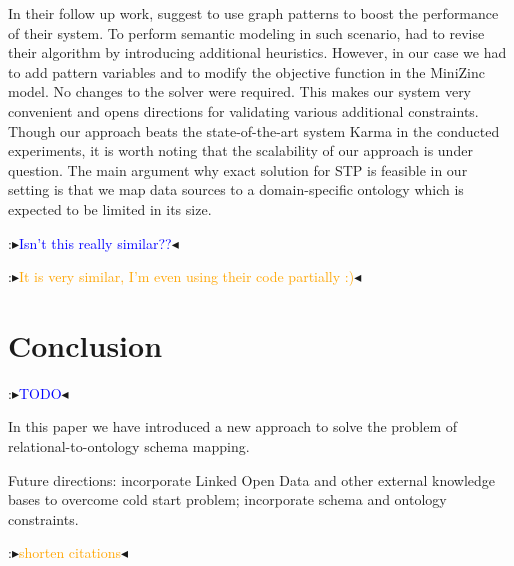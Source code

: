 \documentclass[letterpaper]{article} %
\newcommand{\authornote}[3]{
  {\fbox{\sc 
  #1}:$\blacktriangleright$\textcolor{#2}{\small{#3}}$\blacktriangleleft$}%
}
\newcommand{\ddg}[1]{\authornote{DDG}{blue}{#1}}
\newcommand{\npr}[1]{\authornote{NPR}{orange}{#1}}
\begin{document}
In their follow up work, \cite{Taheriyan:Leveraging} suggest to use graph patterns to boost the performance of their system.
To perform semantic modeling in such scenario, \cite{Taheriyan:Leveraging} had to revise their algorithm by introducing additional heuristics.
However, in our case we had to add pattern variables and to modify the objective function in the MiniZinc model.
No changes to the solver were required.
This makes our system very convenient and opens directions for validating various additional constraints.
Though our approach beats the state-of-the-art system Karma in the conducted experiments, it is worth noting that the scalability of our approach is under question.
The main argument why exact solution for STP is feasible in our setting is that we map data sources to a domain-specific ontology which is expected to be limited in its size.


\ddg{Isn't this really similar??}
\npr{It is very similar, I'm even using their code partially :)}


\section{Conclusion}
\ddg{TODO} 
In this paper we have introduced a new approach to solve the problem of relational-to-ontology schema mapping.

Future directions:
incorporate Linked Open Data and other external knowledge bases to overcome cold start problem;
incorporate schema and ontology constraints.


\npr{shorten citations}

\end{document}

